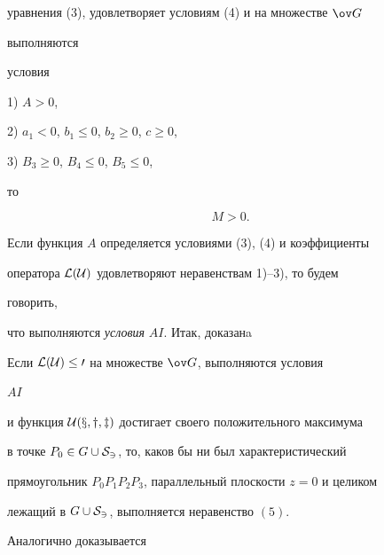 уравнения (3), удовлетворяет условиям (4) и на множестве $\ov G$ 


выполняются 


условия 


 


1) $A>0$, 


 


2) $a_1<0$, $b_1\le0$, $b_2\ge0$, $c\ge0$, 


 


3) $B_3\ge0$, $B_4\le0$, $B_5\le0$, 


 


\noindent{}то 


\begin{equation} 


M>0. 


\end{equation} 


Если функция $A$ определяется условиями (3), (4) и коэффициенты 


оператора $\cal L(\cal U)$ удовлетворяют неравенствам 1)--3), то будем 


говорить, 


что выполняются {\it условия} $AI$. Итак, доказанa


 


\begin{lem} 


Если $\cal L(\cal U)\le0$ на множестве $\ov G$, выполняются условия 


$AI$ 


и функция $\cal U(x,y,z)$ достигает своего положительного максимума 


в точке $P_0\in G\cup\cal S_3$, то, каков бы ни был характеристический 


прямоугольник $P_0P_1P_2P_3$, параллельный плоскости $z=0$ и целиком 


лежащий в $G\cup\cal S_3$, выполняется неравенство $(5)$. 


\end{lem} 


 


Аналогично доказывается


 


